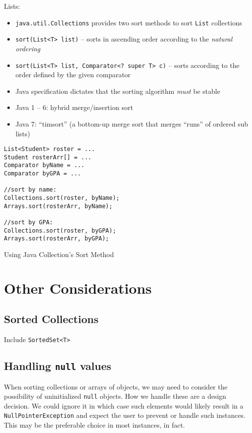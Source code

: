 Lists:
\begin{itemize}
  \item \texttt{java.util.Collections} provides two sort methods to sort \texttt{List} collections
  \item \texttt{sort(List<T> list)} -- sorts in ascending order according to the \emph{natural ordering}
  \item \texttt{sort(List<T> list, Comparator<? super T> c)}  -- sorts according to the order defined by the given comparator
  \item Java specification dictates that the sorting algorithm \emph{must} be stable
  \item Java 1 -- 6: hybrid merge/insertion sort
  \item Java 7: ``timsort'' (a bottom-up merge sort that merges ``runs'' of ordered sub lists)
\end{itemize}

\begin{listing}[H]
\begin{verbatim}
List<Student> roster = ...
Student rosterArr[] = ...
Comparator byName = ...
Comparator byGPA = ...

//sort by name:
Collections.sort(roster, byName);
Arrays.sort(rosterArr, byName);

//sort by GPA:
Collections.sort(roster, byGPA);
Arrays.sort(rosterArr, byGPA);
\end{verbatim}
\caption{Using Java Collection's Sort Method}
\end{listing}


\section{Other Considerations}

\subsection{Sorted Collections}

Include \texttt{SortedSet<T>}

\subsection{Handling \texttt{null} values}


When sorting collections or arrays of objects, we may need to consider the possibility of uninitialized
\texttt{null} objects.  How we handle these are a design decision.  We could ignore it in which case
such elements would likely result in a \texttt{NullPointerException} and expect the user to prevent
or handle such instances.  This may be the preferable choice in most instances, in fact.

